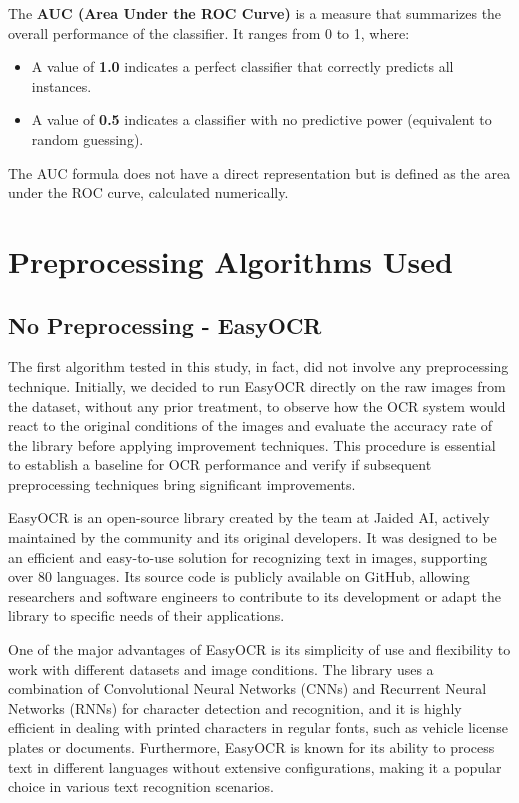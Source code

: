 \documentclass[conference]{IEEEtran}
\begin{document}
	The \textbf{AUC (Area Under the ROC Curve)} is a measure that summarizes the overall performance of the classifier. It ranges from 0 to 1, where:
	
	\begin{itemize}
		\item A value of \textbf{1.0} indicates a perfect classifier that correctly predicts all instances.
		\item A value of \textbf{0.5} indicates a classifier with no predictive power (equivalent to random guessing).
	\end{itemize}
	
	The AUC formula does not have a direct representation but is defined as the area under the ROC curve, calculated numerically.
	
	\section{Preprocessing Algorithms Used}
	
	
	\subsection{No Preprocessing - EasyOCR}
	
	The first algorithm tested in this study, in fact, did not involve any preprocessing technique. Initially, we decided to run EasyOCR directly on the raw images from the dataset, without any prior treatment, to observe how the OCR system would react to the original conditions of the images and evaluate the accuracy rate of the library before applying improvement techniques. This procedure is essential to establish a baseline for OCR performance and verify if subsequent preprocessing techniques bring significant improvements.
	
	EasyOCR is an open-source library created by the team at Jaided AI, actively maintained by the community and its original developers. It was designed to be an efficient and easy-to-use solution for recognizing text in images, supporting over 80 languages. Its source code is publicly available on GitHub, allowing researchers and software engineers to contribute to its development or adapt the library to specific needs of their applications.
	
	One of the major advantages of EasyOCR is its simplicity of use and flexibility to work with different datasets and image conditions. The library uses a combination of Convolutional Neural Networks (CNNs) and Recurrent Neural Networks (RNNs) for character detection and recognition, and it is highly efficient in dealing with printed characters in regular fonts, such as vehicle license plates or documents. Furthermore, EasyOCR is known for its ability to process text in different languages without extensive configurations, making it a popular choice in various text recognition scenarios.
	
\end{document}
